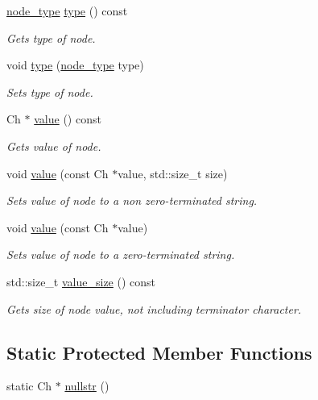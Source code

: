\begin{DoxyCompactItemize}
\mbox{\hyperlink{namespacerapidxml_a6a276b85e2da28c5f9c3dbce61c55682}{node\+\_\+type}} \mbox{\hyperlink{classrapidxml_1_1xml__node_a026a603e420a2e3e7ab820cfbd1a7e97}{type}} () const
\begin{DoxyCompactList}\small\item\em Gets type of node. \end{DoxyCompactList}\item 
void \mbox{\hyperlink{classrapidxml_1_1xml__node_aa78759bfa429fa2ab6bc5fe617cfa3cf}{type}} (\mbox{\hyperlink{namespacerapidxml_a6a276b85e2da28c5f9c3dbce61c55682}{node\+\_\+type}} type)
\begin{DoxyCompactList}\small\item\em Sets type of node. \end{DoxyCompactList}\item 
Ch $\ast$ \mbox{\hyperlink{classrapidxml_1_1xml__base_a558b1045e6751e4024309d41bf35c542}{value}} () const
\begin{DoxyCompactList}\small\item\em Gets value of node. \end{DoxyCompactList}\item 
void \mbox{\hyperlink{classrapidxml_1_1xml__base_ad9640aa3f5374673cb72a5289b6c91eb}{value}} (const Ch $\ast$value, std\+::size\+\_\+t size)
\begin{DoxyCompactList}\small\item\em Sets value of node to a non zero-\/terminated string. \end{DoxyCompactList}\item 
void \mbox{\hyperlink{classrapidxml_1_1xml__base_a18c7469acdca771de9b4f3054053029c}{value}} (const Ch $\ast$value)
\begin{DoxyCompactList}\small\item\em Sets value of node to a zero-\/terminated string. \end{DoxyCompactList}\item 
std\+::size\+\_\+t \mbox{\hyperlink{classrapidxml_1_1xml__base_aa6981b3244607ea4ae7634f74f25361b}{value\+\_\+size}} () const
\begin{DoxyCompactList}\small\item\em Gets size of node value, not including terminator character. \end{DoxyCompactList}\end{DoxyCompactItemize}
\subsection*{Static Protected Member Functions}
\begin{DoxyCompactItemize}
\item 
static Ch $\ast$ \mbox{\hyperlink{classrapidxml_1_1xml__base_a641d0b8df8e0c3c7e0db06ced0e0749f}{nullstr}} ()
\end{DoxyCompactItemize}
